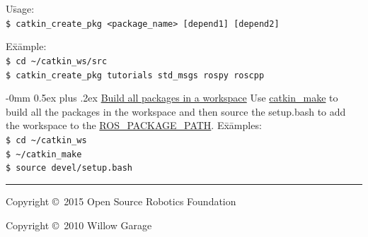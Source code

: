 \documentclass[10pt,landscape]{article}
\makeatletter
\renewcommand{\subsection}{\@startsection{subsection}{2}{0mm}%
                                {-0mm}%
                                {0.5ex plus .2ex}%
                                {\normalfont\normalsize\bfseries}}
\newif\ifcatkin
\newenvironment{nstabbing}
  {\setlength{\topsep}{1pt}%
   \setlength{\partopsep}{1pt}%
   \tabbing}
  {\endtabbing}
\makeatother
\begin{document}
\begin{multicols}{3}
\begin{nstabbing}
U\=sage:\\
\> \texttt{\$ catkin\_create\_pkg <package\_name> [depend1] [depend2]}\\
\end{nstabbing}

\begin{nstabbing}
E\=x\=ample:\\
\> \texttt{\$ cd \textasciitilde/catkin\_ws/src}\\
\> \texttt{\$ catkin\_create\_pkg tutorials std\_msgs rospy roscpp}\\
\end{nstabbing}

\subsection{\href{http://wiki.ros.org/catkin/Tutorials/using_a_workspace}{Build all packages in a workspace}}
Use \href{http://wiki.ros.org/catkin/Tutorials/using\_a\_workspace}{catkin\_make} to build all the packages in the workspace and then source the setup.bash to add the workspace to the \href{http://wiki.ros.org/ROS/EnvironmentVariables#ROS_PACKAGE_PATH}{ROS\_PACKAGE\_PATH}.
\begin{nstabbing}
E\=x\=amples:\\
\> \texttt{\$ cd \textasciitilde/catkin\_ws}\\
\> \texttt{\$ \textasciitilde/catkin\_make}\\
\> \texttt{\$ source devel/setup.bash}\\
\end{nstabbing}

\vspace{30mm}

\else %

\vspace{17cm}

\fi %


\rule{0.3\linewidth}{0.25pt}

\scriptsize

Copyright \copyright\ 2015 Open Source Robotics Foundation

Copyright \copyright\ 2010 Willow Garage
\vspace{3000 mm}


\end{multicols}
\end{document}
